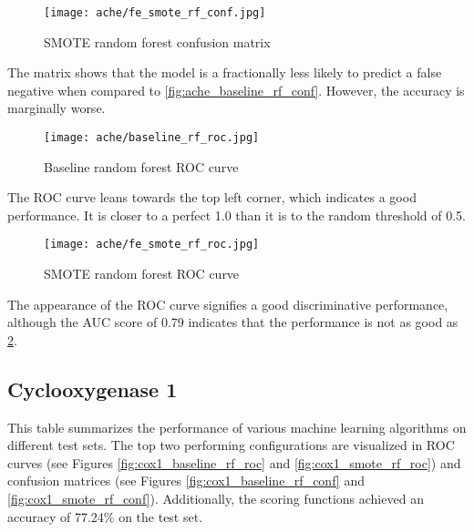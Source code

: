 \begin{figure}[H]
    \begin{center}
        \caption[]{SMOTE random forest confusion matrix}
        \label{fig:ache_smote_rf_conf}
        \texttt{[image: ache/fe\_smote\_rf\_conf.jpg]}
    \end{center}
\end{figure}
The matrix shows that the model is a fractionally less likely to predict a false negative when compared to \ref*{fig:ache_baseline_rf_conf}. However, the accuracy is marginally worse.  

\begin{figure}[H]
    \begin{center}
        \caption[]{Baseline random forest ROC curve}
        \label{fig:ache_baseline_rf_roc}
        \texttt{[image: ache/baseline\_rf\_roc.jpg]}
    \end{center}
\end{figure}
The ROC curve leans towards the top left corner, which indicates a good performance. It is closer to a perfect 1.0 than it is to the random threshold of 0.5.

\begin{figure}[H]
    \begin{center}
        \caption[]{SMOTE random forest ROC curve}
        \label{fig:ache_smote_rf_roc}
        \texttt{[image: ache/fe\_smote\_rf\_roc.jpg]}
    \end{center}
\end{figure}
The appearance of the ROC curve signifies a good discriminative performance, although the AUC score of 0.79 indicates that the performance is not as good as \ref*{fig:ache_baseline_rf_roc}.

\subsection{Cyclooxygenase 1}
This table summarizes the performance of various machine learning algorithms on different test sets.
The top two performing configurations are visualized in ROC curves (see Figures \ref{fig:cox1_baseline_rf_roc} and \ref{fig:cox1_smote_rf_roc})
and confusion matrices (see Figures \ref{fig:cox1_baseline_rf_conf} and \ref{fig:cox1_smote_rf_conf}). Additionally, 
the scoring functions achieved an accuracy of 77.24\% on the test set.

